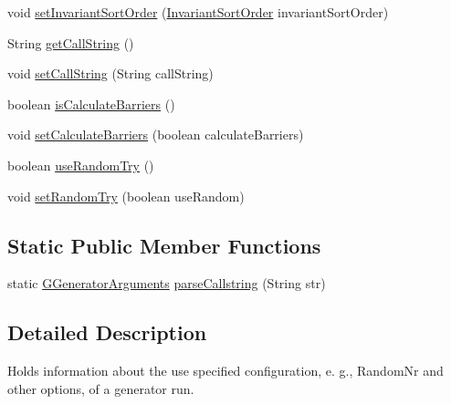 \begin{DoxyCompactItemize}
\item 
void \hyperlink{classorg_1_1tzi_1_1use_1_1gen_1_1tool_1_1_g_generator_arguments_a23e0e45a19606ee8329fa6549c0592c3}{set\-Invariant\-Sort\-Order} (\hyperlink{enumorg_1_1tzi_1_1use_1_1gen_1_1tool_1_1_g_generator_arguments_1_1_invariant_sort_order}{Invariant\-Sort\-Order} invariant\-Sort\-Order)
\item 
String \hyperlink{classorg_1_1tzi_1_1use_1_1gen_1_1tool_1_1_g_generator_arguments_adf6bb1db02168724993273def9c4a70e}{get\-Call\-String} ()
\item 
void \hyperlink{classorg_1_1tzi_1_1use_1_1gen_1_1tool_1_1_g_generator_arguments_aefbe5c1234131d1d61f01b767eb3b742}{set\-Call\-String} (String call\-String)
\item 
boolean \hyperlink{classorg_1_1tzi_1_1use_1_1gen_1_1tool_1_1_g_generator_arguments_acec1bc13fff60cc361a8dc6d7e019eee}{is\-Calculate\-Barriers} ()
\item 
void \hyperlink{classorg_1_1tzi_1_1use_1_1gen_1_1tool_1_1_g_generator_arguments_a17e7ebb96bc4a873da568f75176d71e2}{set\-Calculate\-Barriers} (boolean calculate\-Barriers)
\item 
boolean \hyperlink{classorg_1_1tzi_1_1use_1_1gen_1_1tool_1_1_g_generator_arguments_a47c0bbab1530b6b33f08d962844dab60}{use\-Random\-Try} ()
\item 
void \hyperlink{classorg_1_1tzi_1_1use_1_1gen_1_1tool_1_1_g_generator_arguments_ac442d6fbb043eab5b82b79ba4971a338}{set\-Random\-Try} (boolean use\-Random)
\end{DoxyCompactItemize}
\subsection*{Static Public Member Functions}
\begin{DoxyCompactItemize}
\item 
static \hyperlink{classorg_1_1tzi_1_1use_1_1gen_1_1tool_1_1_g_generator_arguments}{G\-Generator\-Arguments} \hyperlink{classorg_1_1tzi_1_1use_1_1gen_1_1tool_1_1_g_generator_arguments_a2f4313a03999b43aa67b93e0434c10a5}{parse\-Callstring} (String str)
\end{DoxyCompactItemize}


\subsection{Detailed Description}
Holds information about the use specified configuration, e. g., Random\-Nr and other options, of a generator run.

